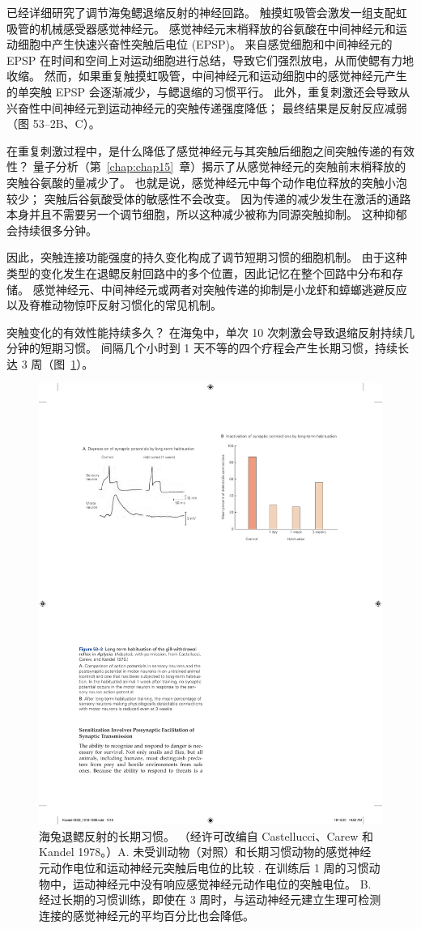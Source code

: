 已经详细研究了调节海兔鳃退缩反射的神经回路。
触摸虹吸管会激发一组支配虹吸管的机械感受器感觉神经元。
感觉神经元末梢释放的谷氨酸在中间神经元和运动细胞中产生快速兴奋性突触后电位 (EPSP)。
来自感觉细胞和中间神经元的 EPSP 在时间和空间上对运动细胞进行总结，导致它们强烈放电，从而使鳃有力地收缩。
然而，如果重复触摸虹吸管，中间神经元和运动细胞中的感觉神经元产生的单突触 EPSP 会逐渐减少，与鳃退缩的习惯平行。
此外，重复刺激还会导致从兴奋性中间神经元到运动神经元的突触传递强度降低；
最终结果是反射反应减弱（图 53–2B、C）。


在重复刺激过程中，是什么降低了感觉神经元与其突触后细胞之间突触传递的有效性？
量子分析（第~\ref{chap:chap15}~章）揭示了从感觉神经元的突触前末梢释放的突触谷氨酸的量减少了。
也就是说，感觉神经元中每个动作电位释放的突触小泡较少；
突触后谷氨酸受体的敏感性不会改变。
因为传递的减少发生在激活的通路本身并且不需要另一个调节细胞，所以这种减少被称为同源突触抑制。
这种抑郁会持续很多分钟。


因此，突触连接功能强度的持久变化构成了调节短期习惯的细胞机制。
由于这种类型的变化发生在退鳃反射回路中的多个位置，因此记忆在整个回路中分布和存储。
感觉神经元、中间神经元或两者对突触传递的抑制是小龙虾和蟑螂逃避反应以及脊椎动物惊吓反射习惯化的常见机制。


突触变化的有效性能持续多久？
在海兔中，单次 10 次刺激会导致退缩反射持续几分钟的短期习惯。
间隔几个小时到 1 天不等的四个疗程会产生长期习惯，持续长达 3 周（图~\ref{fig:53_3}）。


\begin{figure}[htbp]
	\centering
	\includegraphics[width=0.45\linewidth]{chap53/fig_53_3}
	\caption{海兔退鳃反射的长期习惯。 （经许可改编自 Castellucci、Carew 和 Kandel 1978。）A. 未受训动物（对照）和长期习惯动物的感觉神经元动作电位和运动神经元突触后电位的比较 . 在训练后 1 周的习惯动物中，运动神经元中没有响应感觉神经元动作电位的突触电位。 B. 经过长期的习惯训练，即使在 3 周时，与运动神经元建立生理可检测连接的感觉神经元的平均百分比也会降低。}
	\label{fig:53_3}
\end{figure}



